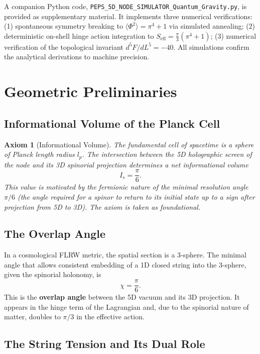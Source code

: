 \documentclass[12pt]{article}
\newtheorem{axiom}[theorem]{Axiom}
\begin{document}
A companion Python code, \texttt{PEPS\_5D\_NODE\_SIMULATOR\_Quantum\_Gravity.py}, is provided as supplementary material. It implements three numerical verifications: (1) spontaneous symmetry breaking to \(\langle\Phi^2\rangle = \pi^4 + 1\) via simulated annealing; (2) deterministic on-shell hinge action integration to \(S_{\text{eff}} = \frac{\pi}{3}(\pi^4+1)\); (3) numerical verification of the topological invariant \(d^5F/dL^5 = -40\). All simulations confirm the analytical derivations to machine precision.

\section{Geometric Preliminaries}

\subsection{Informational Volume of the Planck Cell}

\begin{axiom}[Informational Volume]
The fundamental cell of spacetime is a sphere of Planck length radius \(l_p\). The intersection between the 5D holographic screen of the node and its 3D spinorial projection determines a net informational volume
\[
I_s = \frac{\pi}{6}.
\]
This value is motivated by the fermionic nature of the minimal resolution angle \(\pi/6\) (the angle required for a spinor to return to its initial state up to a sign after projection from 5D to 3D). The axiom is taken as foundational.
\end{axiom}

\subsection{The Overlap Angle}

In a cosmological FLRW metric, the spatial section is a 3-sphere. The minimal angle that allows consistent embedding of a 1D closed string into the 3-sphere, given the spinorial holonomy, is
\[
\chi = \frac{\pi}{6}.
\]
This is the \textbf{overlap angle} between the 5D vacuum and its 3D projection. It appears in the hinge term of the Lagrangian and, due to the spinorial nature of matter, doubles to \(\pi/3\) in the effective action.

\subsection{The String Tension and Its Dual Role}
\end{document}
